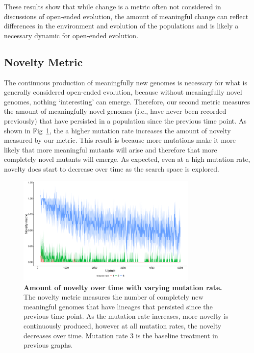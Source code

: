 \documentclass[letterpaper]{article}
\begin{document}
These results show that while change is a metric often not considered in discussions of open-ended evolution, the amount of meaningful change can reflect differences in the environment and evolution of the populations and is likely a necessary dynamic for open-ended evolution.

\subsection{Novelty Metric}
The continuous production of meaningfully new genomes is necessary for what is generally considered open-ended evolution, because without meaningfully novel genomes, nothing `interesting' can emerge. Therefore, our second metric measures the amount of meaningfully novel genomes (i.e., have never been recorded previously) that have persisted in a population since the previous time point. As shown in Fig~\ref{novelty_time}, the a higher mutation rate increases the amount of novelty measured by our metric. This result is because more mutations make it more likely that more meaningful mutants will arise and therefore that more completely novel mutants will emerge. As expected, even at a high mutation rate, novelty does start to decrease over time as the search space is explored.

\begin{figure}
\includegraphics[width=3.5in]{figs/novelty_mean_mut_rate.png}
\caption{\textbf{Amount of novelty over time with varying mutation rate.} The novelty metric measures the number of completely new meaningful genomes that have lineages that persisted since the previous time point. As the mutation rate increases, more novelty is continuously produced, however at all mutation rates, the novelty decreases over time. Mutation rate 3 is the baseline treatment in previous graphs.}
\label{novelty_time}
\end{figure}
\end{document}
